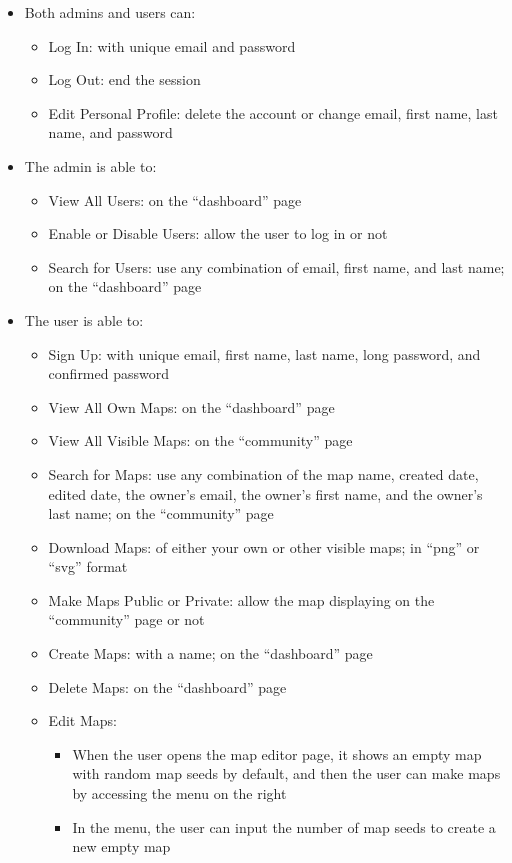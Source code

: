 \begin{itemize}
  \item Both admins and users can:
  \begin{itemize}
    \item Log In: with unique email and password
    \item Log Out: end the session
    \item Edit Personal Profile: delete the account or change email, first name, last name, and password
  \end{itemize}
  \item The admin is able to:
  \begin{itemize}
    \item View All Users: on the ``dashboard'' page
    \item Enable or Disable Users: allow the user to log in or not
    \item Search for Users: use any combination of email, first name, and last name; on the ``dashboard'' page
  \end{itemize}
  \item The user is able to:
  \begin{itemize}
    \item Sign Up: with unique email, first name, last name, long password, and confirmed password
    \item View All Own Maps: on the ``dashboard'' page
    \item View All Visible Maps: on the ``community'' page
    \item Search for Maps: use any combination of the map name, created date, edited date, the owner's email, the owner's first name, and the owner's last name; on the ``community'' page
    \item Download Maps: of either your own or other visible maps; in ``png'' or ``svg'' format
    \item Make Maps Public or Private: allow the map displaying on the ``community'' page or not
    \item Create Maps: with a name; on the ``dashboard'' page
    \item Delete Maps: on the ``dashboard'' page
    \item Edit Maps:
    \begin{itemize}
      \item When the user opens the map editor page, it shows an empty map with random map seeds by default, and then the user can make maps by accessing the menu on the right
    	\item In the menu, the user can input the number of map seeds to create a new empty map

\end{itemize}
\end{itemize}
\end{itemize}
